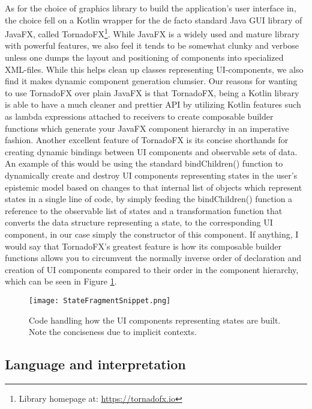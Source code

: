 As for the choice of graphics library to build the application's user interface in, the choice fell on a Kotlin wrapper for the de facto standard Java GUI library of JavaFX, called TornadoFX\footnote{Library homepage at: \url{https://tornadofx.io}}. While JavaFX is a widely used and mature library with powerful features, we also feel it tends to be somewhat clunky and verbose unless one dumps the layout and positioning of components into specialized XML-files. While this helps clean up classes representing UI-components, we also find it makes dynamic component generation clumsier. Our reasons for wanting to use TornadoFX over plain JavaFX is that TornadoFX, being a Kotlin library is able to have a much cleaner and prettier API by utilizing Kotlin features such as lambda expressions attached to receivers to create composable builder functions which generate your JavaFX component hierarchy in an imperative fashion. Another excellent feature of TornadoFX is its concise shorthands for creating dynamic bindings between UI components and observable sets of data. An example of this would be using the standard bindChildren() function to dynamically create and destroy UI components representing states in the user's epistemic model based on changes to that internal list of objects which represent states in a single line of code, by simply feeding the bindChildren() function a reference to the observable list of states and a transformation function that converts the data structure representing a state, to the corresponding UI component, in our case simply the constructor of this component. If anything, I would say that TornadoFX's greatest feature is how its composable builder functions allows you to circumvent the normally inverse order of declaration and creation of UI components compared to their order in the component hierarchy, which can be seen in Figure \ref{fig:StatFragSnip}.

\begin{figure}[h]
	\label{fig:StatFragSnip}
	\caption{Code handling how the UI components representing states are built. Note the conciseness due to implicit contexts.}
	\texttt{[image: StateFragmentSnippet.png]}
\end{figure}

\subsection{Language and interpretation}


